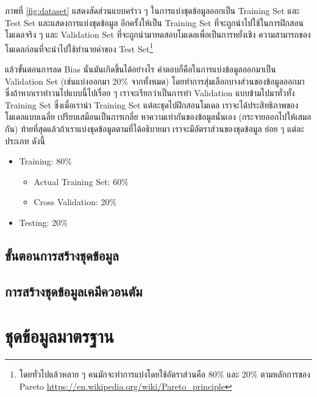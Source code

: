 ภาพที่ \ref{fig:dataset} แสดงสัดส่วนแบบคร่าว ๆ ในการแบ่งชุดข้อมูลออกเป็น Training Set และ Test Set และแสดงการแบ่งชุดข้อมูล%
อีกครั้งให้เป็น Training Set ที่จะถูกนำไปใช้ในการฝึกสอนโมเดลจริง ๆ และ Validation Set ที่จะถูกนำมาทดสอบโมเดลเพื่อเป็นการหยั่งเชิง%
ความสามารถของโมเดลก่อนที่จะนำไปใช้ทำนายค่าของ Test Set\footnote{โดยทั่วไปแล้วหลาย ๆ คนมักจะทำการแบ่งโดยใช้อัตราส่วนคือ 
80\% และ 20\% ตามหลักการของ Pareto \url{https://en.wikipedia.org/wiki/Pareto_principle}}

แล้วขั้นตอนการลด Bias นั่นมันเกิดขึ้นได้อย่างไร คำตอบก็คือในการแบ่งข้อมูลออกมาเป็น Validation Set (เช่นแบ่งออกมา 20\% จากทั้งหมด)
โดยทำการสุ่มเลือกบางส่วนของข้อมูลออกมา ซึ่งถ้าหากเราทำวนไปแบบนี้ไปเรื่อย ๆ เราจะเรียกว่าเป็นการทำ Validation แบบข้ามไปมาทั่วทั้ง 
Training Set ซึ่งเมื่อเรานำ Training Set แต่ละชุดไปฝึกสอนโมเดล เราจะได้ประสิทธิภาพของโมเดลแบบเฉลี่ย เปรียบเสมือนเป็นการเกลี่ย%
หาความเท่ากันของข้อมูลนั่นเอง (กระจายออกไปให้เสมอกัน) ท้ายที่สุดแล้วถ้าเราแบ่งชุดข้อมูลตามที่ได้อธิบายมา เราจะมีอัตราส่วนของชุดข้อมูล%
ย่อย ๆ แต่ละประเภท ดังนี้

\begin{itemize}
    \item Training: 80\%
    \begin{itemize}
        \item Actual Training Set: 60\%
        \item Cross Validation: 20\%
    \end{itemize}
    \item Testing: 20\%
\end{itemize}

\subsection{ขั้นตอนการสร้างชุดข้อมูล}
\label{ssec:step_create_dataset}


\subsection{การสร้างชุดข้อมูลเคมีควอนตัม}
\label{ssec:step_create_qm_dataset}

\section{ชุดข้อมูลมาตรฐาน}
\label{sec:std_dataset}


